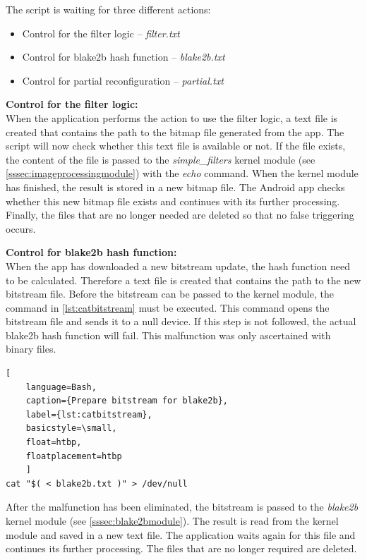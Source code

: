 The script is waiting for three different actions:
\begin{itemize}
    \item Control for the filter logic -- \emph{filter.txt}
    \item Control for blake2b hash function -- \emph{blake2b.txt}
    \item Control for partial reconfiguration -- \emph{partial.txt}
\end{itemize}

\textbf{Control for the filter logic:}\\
When the application performs the action to use the filter logic, a text file is created that contains the path to the bitmap file generated from the app.
The script will now check whether this text file is available or not. If the file exists, the content of the file is passed to the \emph{simple_filters} kernel module (see \cref{sssec:imageprocessingmodule}) with the \emph{echo} command. When the kernel module has finished, the result is stored in a new bitmap file.
The Android app checks whether this new bitmap file exists and continues with its further processing.
Finally, the files that are no longer needed are deleted so that no false triggering occurs.
\medbreak

\textbf{Control for blake2b hash function:}\\
When the app has downloaded a new bitstream update, the hash function need to be calculated. Therefore a text file is created that contains the path to the new bitstream file. Before the bitstream can be passed to the kernel module, the command in \cref{lst:catbitstream} must be executed. This command opens the bitstream file and sends it to a null device. If this step is not followed, the actual blake2b hash function will fail. This malfunction was only ascertained with binary files. 
\begin{lstlisting}[
	language=Bash,
	caption={Prepare bitstream for blake2b},
	label={lst:catbitstream},
	basicstyle=\small,
	float=htbp,
	floatplacement=htbp
	]
cat "$( < blake2b.txt )" > /dev/null
\end{lstlisting}

After the malfunction has been eliminated, the bitstream is passed to the \emph{blake2b} kernel module (see \cref{sssec:blake2bmodule}). The result is read from the kernel module and saved in a new text file. 
The application waits again for this file and continues its further processing. 
The files that are no longer required are deleted.
\medbreak

